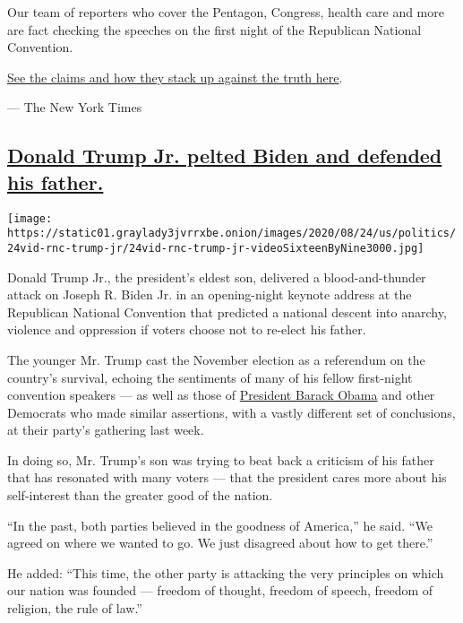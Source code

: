 Our team of reporters who cover the Pentagon, Congress, health care and
more are fact checking the speeches on the first night of the Republican
National Convention.

\href{https://www.nytimes3xbfgragh.onion/live/2020/08/24/us/rnc-fact-check}{See
the claims and how they stack up against the truth here}.

--- The New York Times

\hypertarget{donald-trump-jr-pelted-biden-and-defended-his-father}{%
\subsection{\texorpdfstring{\protect\hyperlink{donald-trump-jr-pelted-biden-and-defended-his-father}{Donald
Trump Jr. pelted Biden and defended his
father.}}{Donald Trump Jr. pelted Biden and defended his father.}}\label{donald-trump-jr-pelted-biden-and-defended-his-father}}

\texttt{[image: https://static01.graylady3jvrrxbe.onion/images/2020/08/24/us/politics/24vid-rnc-trump-jr/24vid-rnc-trump-jr-videoSixteenByNine3000.jpg]}

Donald Trump Jr., the president's eldest son, delivered a
blood-and-thunder attack on Joseph R. Biden Jr. in an opening-night
keynote address at the Republican National Convention that predicted a
national descent into anarchy, violence and oppression if voters choose
not to re-elect his father.

The younger Mr. Trump cast the November election as a referendum on the
country's survival, echoing the sentiments of many of his fellow
first-night convention speakers --- as well as those of
\href{https://www.nytimes3xbfgragh.onion/2020/08/19/us/politics/obama-speech.html}{President
Barack Obama} and other Democrats who made similar assertions, with a
vastly different set of conclusions, at their party's gathering last
week.

In doing so, Mr. Trump's son was trying to beat back a criticism of his
father that has resonated with many voters --- that the president cares
more about his self-interest than the greater good of the nation.

``In the past, both parties believed in the goodness of America,'' he
said. ``We agreed on where we wanted to go. We just disagreed about how
to get there.''

He added: ``This time, the other party is attacking the very principles
on which our nation was founded --- freedom of thought, freedom of
speech, freedom of religion, the rule of law.''

